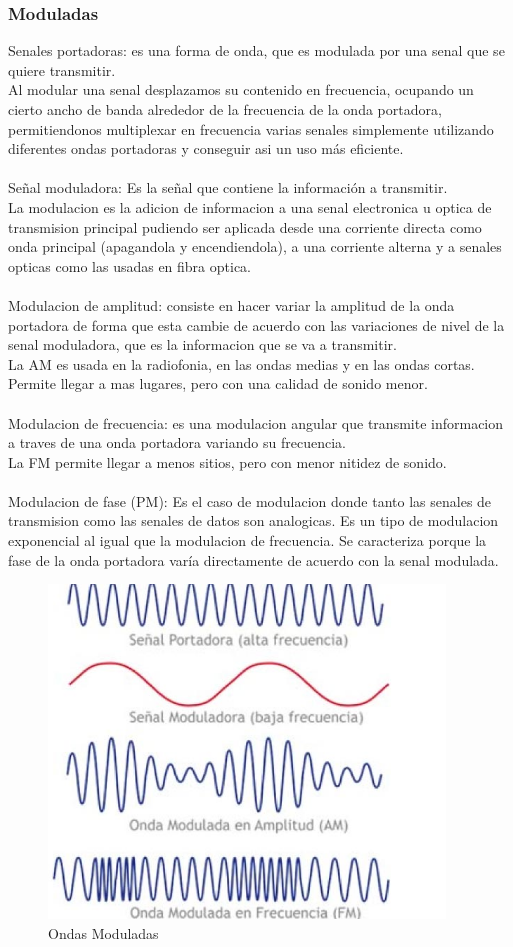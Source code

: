 \documentclass[11pt]{article}
\begin{document}
\subsubsection{Moduladas}
Senales portadoras: es una forma de onda, que es modulada por una senal que se quiere transmitir.\\
Al modular una senal desplazamos su contenido en frecuencia, ocupando un cierto ancho de banda alrededor de la frecuencia de la onda portadora, permitiendonos multiplexar en frecuencia varias senales simplemente utilizando diferentes ondas portadoras y conseguir asi un uso más eficiente.\\\\
Señal moduladora: Es la señal que contiene la información a transmitir.\\
La modulacion es la adicion de informacion a una senal electronica u optica de transmision principal pudiendo ser aplicada desde una corriente directa como onda principal (apagandola y encendiendola), a una corriente alterna y a senales opticas como las usadas en fibra optica.\\\\
Modulacion de amplitud: consiste en hacer variar la amplitud de la onda portadora de forma que esta cambie de acuerdo con las variaciones de nivel de la senal moduladora, que es la informacion que se va a transmitir.\\
La AM es usada en la radiofonia, en las ondas medias y en las ondas cortas. Permite llegar a mas lugares, pero con una calidad de sonido menor.\\\\
Modulacion de frecuencia: es una modulacion angular que transmite informacion a traves de una onda portadora variando su frecuencia.\\
La FM permite llegar a menos sitios, pero con menor nitidez de sonido.\\\\
Modulacion de fase (PM): Es el caso de modulacion donde tanto las senales de transmision como las senales de datos son analogicas. Es un tipo de modulacion exponencial al igual que la modulacion de frecuencia. Se caracteriza porque la fase de la onda portadora varía directamente de acuerdo con la senal modulada.
\begin{figure}[htp]
\centering
\includegraphics[scale=0.60]{Ondas Moduladas.png}
\caption{Ondas Moduladas}
\label{}
\end{figure}
\end{document}
